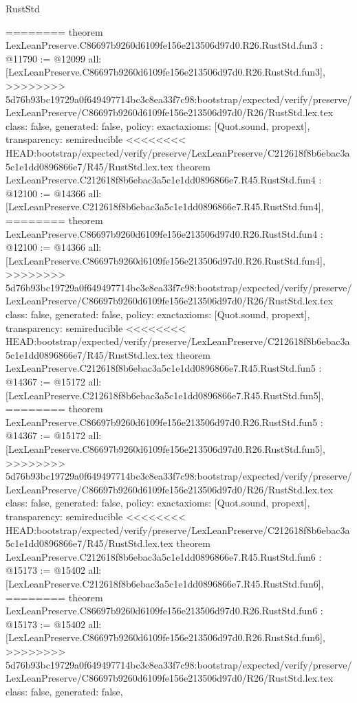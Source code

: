 \begin{lexlean}{RustStd}
\begin{coremodule}
{\begin{coremodule}
{{{{{{========
theorem LexLeanPreserve.C86697b9260d6109fe156e213506d97d0.R26.RustStd.fun3 : @11790 := @12099 {
  all: [LexLeanPreserve.C86697b9260d6109fe156e213506d97d0.R26.RustStd.fun3],
>>>>>>>> 5d76b93bc19729a0f649497714bc3c8ea33f7c98:bootstrap/expected/verify/preserve/LexLeanPreserve/C86697b9260d6109fe156e213506d97d0/R26/RustStd.lex.tex
  class: false,
  generated: false,
  policy: exact{axioms: [Quot.sound, propext]},
  transparency: semireducible
}
<<<<<<<< HEAD:bootstrap/expected/verify/preserve/LexLeanPreserve/C212618f8b6ebac3a5c1e1dd0896866e7/R45/RustStd.lex.tex
theorem LexLeanPreserve.C212618f8b6ebac3a5c1e1dd0896866e7.R45.RustStd.fun4 : @12100 := @14366 {
  all: [LexLeanPreserve.C212618f8b6ebac3a5c1e1dd0896866e7.R45.RustStd.fun4],
========
theorem LexLeanPreserve.C86697b9260d6109fe156e213506d97d0.R26.RustStd.fun4 : @12100 := @14366 {
  all: [LexLeanPreserve.C86697b9260d6109fe156e213506d97d0.R26.RustStd.fun4],
>>>>>>>> 5d76b93bc19729a0f649497714bc3c8ea33f7c98:bootstrap/expected/verify/preserve/LexLeanPreserve/C86697b9260d6109fe156e213506d97d0/R26/RustStd.lex.tex
  class: false,
  generated: false,
  policy: exact{axioms: [Quot.sound, propext]},
  transparency: semireducible
}
<<<<<<<< HEAD:bootstrap/expected/verify/preserve/LexLeanPreserve/C212618f8b6ebac3a5c1e1dd0896866e7/R45/RustStd.lex.tex
theorem LexLeanPreserve.C212618f8b6ebac3a5c1e1dd0896866e7.R45.RustStd.fun5 : @14367 := @15172 {
  all: [LexLeanPreserve.C212618f8b6ebac3a5c1e1dd0896866e7.R45.RustStd.fun5],
========
theorem LexLeanPreserve.C86697b9260d6109fe156e213506d97d0.R26.RustStd.fun5 : @14367 := @15172 {
  all: [LexLeanPreserve.C86697b9260d6109fe156e213506d97d0.R26.RustStd.fun5],
>>>>>>>> 5d76b93bc19729a0f649497714bc3c8ea33f7c98:bootstrap/expected/verify/preserve/LexLeanPreserve/C86697b9260d6109fe156e213506d97d0/R26/RustStd.lex.tex
  class: false,
  generated: false,
  policy: exact{axioms: [Quot.sound, propext]},
  transparency: semireducible
}
<<<<<<<< HEAD:bootstrap/expected/verify/preserve/LexLeanPreserve/C212618f8b6ebac3a5c1e1dd0896866e7/R45/RustStd.lex.tex
theorem LexLeanPreserve.C212618f8b6ebac3a5c1e1dd0896866e7.R45.RustStd.fun6 : @15173 := @15402 {
  all: [LexLeanPreserve.C212618f8b6ebac3a5c1e1dd0896866e7.R45.RustStd.fun6],
========
theorem LexLeanPreserve.C86697b9260d6109fe156e213506d97d0.R26.RustStd.fun6 : @15173 := @15402 {
  all: [LexLeanPreserve.C86697b9260d6109fe156e213506d97d0.R26.RustStd.fun6],
>>>>>>>> 5d76b93bc19729a0f649497714bc3c8ea33f7c98:bootstrap/expected/verify/preserve/LexLeanPreserve/C86697b9260d6109fe156e213506d97d0/R26/RustStd.lex.tex
  class: false,
  generated: false,
}}}}}}}}}}
\end{coremodule}}
\end{coremodule}
\end{lexlean}

